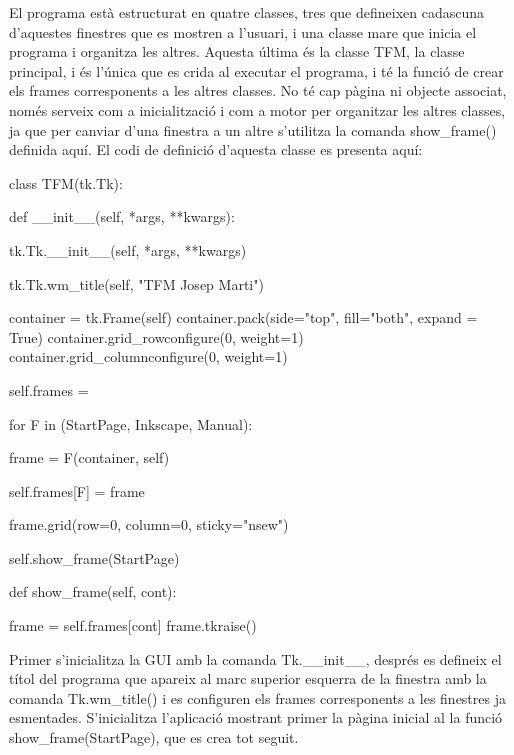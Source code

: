 El programa està estructurat en quatre classes, tres que defineixen cadascuna d’aquestes finestres que es mostren a l’usuari, i una classe mare que inicia el programa i organitza les altres. Aquesta última és la classe TFM, la classe principal, i és l’única que es crida al executar el programa, i té la funció de crear els frames corresponents a les altres classes. No té cap pàgina ni objecte associat, només serveix com a inicialització i com a motor per organitzar les altres classes, ja que per canviar d’una finestra a un altre s’utilitza la comanda show\_frame() definida aquí. El codi de definició d’aquesta classe es presenta aquí:

\begin{python}
	class TFM(tk.Tk):
	
		def __init__(self, *args, **kwargs):
		
			tk.Tk.__init__(self, *args, **kwargs)
			
			tk.Tk.wm_title(self, "TFM Josep Marti")
			
			
			container = tk.Frame(self)
			container.pack(side="top", fill="both", expand = True)
			container.grid_rowconfigure(0, weight=1)
			container.grid_columnconfigure(0, weight=1)
			
			self.frames = {}
			
			for F in (StartPage, Inkscape, Manual):
			
			frame = F(container, self)
			
			self.frames[F] = frame
			
			frame.grid(row=0, column=0, sticky="nsew")
			
			self.show_frame(StartPage)
		
		def show_frame(self, cont):
		
			frame = self.frames[cont]
			frame.tkraise()
\end{python}

Primer s’inicialitza la GUI amb la comanda Tk.\_\_init\_\_, després es defineix el títol del programa que apareix al marc superior esquerra de la finestra amb la comanda Tk.wm\_title() i es configuren els frames corresponents a les finestres ja esmentades. S’inicialitza l’aplicació mostrant primer la pàgina inicial al la funció show\_frame(StartPage), que es crea tot seguit. 

